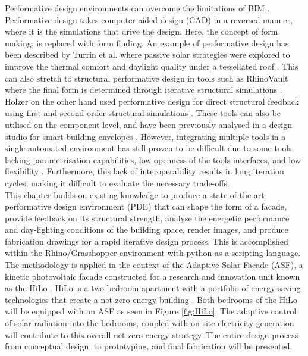Performative design environments can overcome the limitations of BIM \cite{oxman2008performance}. Performative design takes computer aided design (CAD) in a reversed manner, where it is the simulations that drive the design. Here, the concept of form making, is replaced with form finding. An example of performative design has been described by Turrin et al. where passive solar strategies were explored to improve the thermal comfort and daylight quality under a tessellated roof \cite{turrin2012performative}. This can also stretch to structural performative design in tools such as RhinoVault where the final form is determined through iterative structural simulations \cite{Rippmann2012}. Holzer on the other hand used performative design for direct structural feedback using first and second order structural simulations \cite{holzer2016design}. These tools can also be utilised on the component level, and have been previously analysed in a design studio for smart building envelopes \cite{kim2017exploratory}. However, integrating multiple tools in a single automated environment has still proven to be difficult due to some tools lacking parametrisation capabilities, low openness of the tools interfaces, and low flexibility \cite{diaz2017multidisciplinary,negendahl2015building}. Furthermore, this lack of interoperability results in long iteration cycles, making it difficult to evaluate the necessary trade-offs.\\

This chapter builds on existing knowledge to produce a state of the art performative design environment (PDE) that can shape the form of a facade, provide feedback on its structural strength, analyse the energetic performance and day-lighting conditions of the building space, render images, and produce fabrication drawings for a rapid iterative design process. This is accomplished within the Rhino/Grasshopper environment with python as a scripting language. The methodology is applied in the context of the Adaptive Solar Facade (ASF), a kinetic photovoltaic facade constructed for a research and innovation unit known as the HiLo \cite{Block2017}. HiLo is a two bedroom apartment with a portfolio of energy saving technologies that create a net zero energy building \cite{lydon2017coupling}. Both bedrooms of the HiLo will be equipped with an ASF as seen in Figure \ref{fig:HiLo}. The adaptive control of solar radiation into the bedrooms, coupled with on site electricity generation will contribute to this overall net zero energy strategy.  The entire design process from conceptual design, to prototyping, and final fabrication will be presented.  



